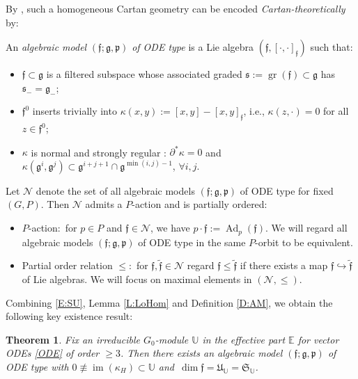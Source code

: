 \documentclass[10pt,a4paper]{amsart}
\DeclareMathOperator{\gr}{gr}
\DeclareMathOperator{\img}{im}
\newcommand\cN{\mathcal{N}}
\newcommand{\g}{\mathfrak{g}}
\newcommand\Ad{\operatorname{Ad}}
\renewcommand\gr{\operatorname{gr}}
\newcommand\ff{\mathfrak{f}}
\newcommand\fp{\mathfrak{p}}
\newcommand\fS{\mathfrak{S}}
\newcommand\fs{\mathfrak{s}}
\newcommand\fU{\mathfrak{U}}
\newcommand\bbE{\mathbb{E}}
\newcommand\bbU{\mathbb{U}}
\numberwithin{equation}{section}
\newtheorem{Theorem}{Theorem}[section]
\begin{document}
By \cite[Section~A.1]{KT2021}, such a homogeneous Cartan geometry can be encoded {\em Cartan-the\-o\-ret\-i\-cal\-ly} by:

\begin{Definition} \label{D:AM}
An {\em algebraic model} $(\ff;\g,\fp)$ {\em of ODE type} is a Lie algebra $(\ff,[\cdot,\cdot]_\ff)$ such that:
\begin{itemize}\itemsep=0pt
\item [(i)] $\ff \subset \g$ is a filtered subspace whose associated graded $\fs:=\gr(\ff) \subset \g$ has $\fs_- = \g_-$;
\item [(ii)] $\ff^0$ inserts trivially into $\kappa(x,y) := [x,y]-[x,y]_\ff$, i.e., $\kappa(z,\cdot) = 0$ for all $z \in \ff^0$;
\item [(iii)] $\kappa$ is normal and strongly regular : $\partial^\ast \kappa = 0$ and $\kappa(\g^i, \g^j) \subset \g^{i+j+1} \cap \g^{\min (i,j)-1}$, $\forall i,j$.
\end{itemize}
\end{Definition}

Let $\cN$ denote the set of all algebraic models $(\ff;\g,\fp )$ of ODE type for fixed $(G,P)$. Then $\cN$ admits a $P$-action and is partially ordered:
\begin{itemize}\itemsep=0pt
\item[(1)] $P$-action:\, for $p \in P$ and $ \ff \in \cN$, we have $p\cdot \ff := \Ad_{p}(\ff)$. We will regard all algebraic models $(\ff;\g,\fp)$ of ODE type in the same $P$-orbit to be equivalent.
\item[(2)] Partial order relation $\le$:\, for $\ff, \widetilde{\ff} \in \cN$ regard $\ff \le \widetilde{\ff}$ if there exists a map $\ff \hookrightarrow \widetilde{\ff}$ of Lie algebras. We will focus on maximal elements in $(\cN, \le)$.
\end{itemize}

Combining \eqref{E:SU}, Lemma \ref{L:LoHom} and Definition \ref{D:AM}, we obtain the following key existence result:

\begin{Theorem} \label{T:Existance}
Fix an irreducible $G_0$-module $\bbU$ in the effective part $\bbE$ for vector ODEs \eqref{ODE} of order $\ge 3$. Then there {\em exists} an algebraic model $(\ff;\g, \fp)$ of ODE type with $ 0 \not\equiv \img(\kappa_H) \subset \bbU$ and~$ \dim \ff = \fU_\bbU = \fS_\bbU$.
\end{Theorem}
\end{document}
